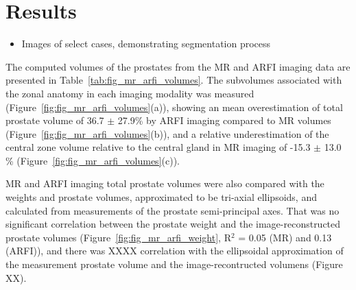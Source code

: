 \section{Results}\label{sect:results}

\begin{itemize}
    \item Images of select cases, demonstrating segmentation process
\end{itemize}

The computed volumes of the prostates from the MR and ARFI imaging data are
presented in Table~\ref{tab:fig_mr_arfi_volumes}.  The subvolumes associated
with the zonal anatomy in each imaging modality was measured
(Figure~\ref{fig:fig_mr_arfi_volumes}(a)), showing an mean overestimation of
total prostate volume of 36.7 $\pm$ 27.9\% by ARFI imaging compared to MR
volumes (Figure~\ref{fig:fig_mr_arfi_volumes}(b)), and a relative
underestimation of the central zone volume relative to the central gland in MR
imaging of -15.3 $\pm$ 13.0 \% (Figure~\ref{fig:fig_mr_arfi_volumes}(c)).





MR and ARFI imaging total prostate volumes were also compared with the weights
and prostate volumes, approximated to be tri-axial ellipsoids, and calculated
from measurements of the prostate semi-principal axes.  That was no significant
correlation between the prostate weight and the image-reconstructed prostate
volumes (Figure~\ref{fig:fig_mr_arfi_weight}, R$^2$ = 0.05 (MR) and 0.13
(ARFI)), and there was XXXX correlation with the ellipsoidal approximation of
the measurement prostate volume and the image-recontructed volumens (Figure
XX).




